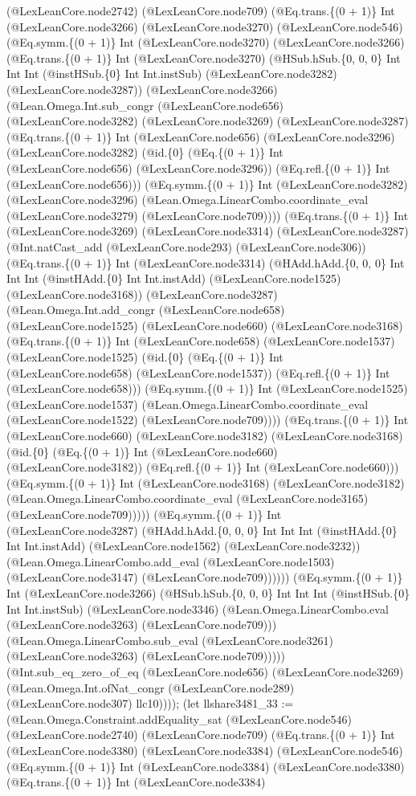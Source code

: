\documentclass[11pt]{article}
\begin{document}
(@LexLeanCore.node2742) (@LexLeanCore.node709) (@Eq.trans.\{(0 + 1)\} Int (@LexLeanCore.node3266) (@LexLeanCore.node3270) (@LexLeanCore.node546) (@Eq.symm.\{(0 + 1)\} Int (@LexLeanCore.node3270) (@LexLeanCore.node3266) (@Eq.trans.\{(0 + 1)\} Int (@LexLeanCore.node3270) (@HSub.hSub.\{0, 0, 0\} Int Int Int (@instHSub.\{0\} Int Int.instSub) (@LexLeanCore.node3282) (@LexLeanCore.node3287)) (@LexLeanCore.node3266) (@Lean.Omega.Int.sub\_congr (@LexLeanCore.node656) (@LexLeanCore.node3282) (@LexLeanCore.node3269) (@LexLeanCore.node3287) (@Eq.trans.\{(0 + 1)\} Int (@LexLeanCore.node656) (@LexLeanCore.node3296) (@LexLeanCore.node3282) (@id.\{0\} (@Eq.\{(0 + 1)\} Int (@LexLeanCore.node656) (@LexLeanCore.node3296)) (@Eq.refl.\{(0 + 1)\} Int (@LexLeanCore.node656))) (@Eq.symm.\{(0 + 1)\} Int (@LexLeanCore.node3282) (@LexLeanCore.node3296) (@Lean.Omega.LinearCombo.coordinate\_eval (@LexLeanCore.node3279) (@LexLeanCore.node709)))) (@Eq.trans.\{(0 + 1)\} Int (@LexLeanCore.node3269) (@LexLeanCore.node3314) (@LexLeanCore.node3287) (@Int.natCast\_add (@LexLeanCore.node293) (@LexLeanCore.node306)) (@Eq.trans.\{(0 + 1)\} Int (@LexLeanCore.node3314) (@HAdd.hAdd.\{0, 0, 0\} Int Int Int (@instHAdd.\{0\} Int Int.instAdd) (@LexLeanCore.node1525) (@LexLeanCore.node3168)) (@LexLeanCore.node3287) (@Lean.Omega.Int.add\_congr (@LexLeanCore.node658) (@LexLeanCore.node1525) (@LexLeanCore.node660) (@LexLeanCore.node3168) (@Eq.trans.\{(0 + 1)\} Int (@LexLeanCore.node658) (@LexLeanCore.node1537) (@LexLeanCore.node1525) (@id.\{0\} (@Eq.\{(0 + 1)\} Int (@LexLeanCore.node658) (@LexLeanCore.node1537)) (@Eq.refl.\{(0 + 1)\} Int (@LexLeanCore.node658))) (@Eq.symm.\{(0 + 1)\} Int (@LexLeanCore.node1525) (@LexLeanCore.node1537) (@Lean.Omega.LinearCombo.coordinate\_eval (@LexLeanCore.node1522) (@LexLeanCore.node709)))) (@Eq.trans.\{(0 + 1)\} Int (@LexLeanCore.node660) (@LexLeanCore.node3182) (@LexLeanCore.node3168) (@id.\{0\} (@Eq.\{(0 + 1)\} Int (@LexLeanCore.node660) (@LexLeanCore.node3182)) (@Eq.refl.\{(0 + 1)\} Int (@LexLeanCore.node660))) (@Eq.symm.\{(0 + 1)\} Int (@LexLeanCore.node3168) (@LexLeanCore.node3182) (@Lean.Omega.LinearCombo.coordinate\_eval (@LexLeanCore.node3165) (@LexLeanCore.node709))))) (@Eq.symm.\{(0 + 1)\} Int (@LexLeanCore.node3287) (@HAdd.hAdd.\{0, 0, 0\} Int Int Int (@instHAdd.\{0\} Int Int.instAdd) (@LexLeanCore.node1562) (@LexLeanCore.node3232)) (@Lean.Omega.LinearCombo.add\_eval (@LexLeanCore.node1503) (@LexLeanCore.node3147) (@LexLeanCore.node709)))))) (@Eq.symm.\{(0 + 1)\} Int (@LexLeanCore.node3266) (@HSub.hSub.\{0, 0, 0\} Int Int Int (@instHSub.\{0\} Int Int.instSub) (@LexLeanCore.node3346) (@Lean.Omega.LinearCombo.eval (@LexLeanCore.node3263) (@LexLeanCore.node709))) (@Lean.Omega.LinearCombo.sub\_eval (@LexLeanCore.node3261) (@LexLeanCore.node3263) (@LexLeanCore.node709))))) (@Int.sub\_eq\_zero\_of\_eq (@LexLeanCore.node656) (@LexLeanCore.node3269) (@Lean.Omega.Int.ofNat\_congr (@LexLeanCore.node289) (@LexLeanCore.node307) llc10)))); (let llshare3481\_33 := (@Lean.Omega.Constraint.addEquality\_sat (@LexLeanCore.node546) (@LexLeanCore.node2740) (@LexLeanCore.node709) (@Eq.trans.\{(0 + 1)\} Int (@LexLeanCore.node3380) (@LexLeanCore.node3384) (@LexLeanCore.node546) (@Eq.symm.\{(0 + 1)\} Int (@LexLeanCore.node3384) (@LexLeanCore.node3380) (@Eq.trans.\{(0 + 1)\} Int (@LexLeanCore.node3384) 
\end{document}
